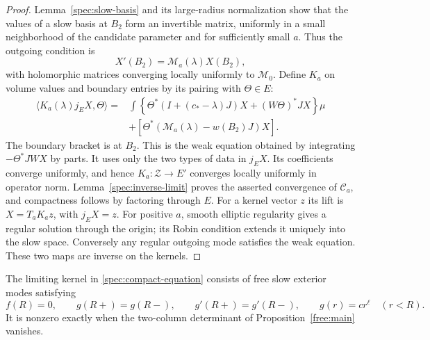 \begin{proof}
Lemma~\ref{spec:slow-basis} and its large-radius normalization show
that the values of a slow basis at $B_2$ form an invertible matrix,
uniformly in a small neighborhood of the candidate parameter and
for sufficiently small $a$. Thus the outgoing condition is
\[
 X'(B_2)=\mathcal M_a(\lambda)X(B_2),
\]
with holomorphic matrices converging locally uniformly to
$\mathcal M_0$. Define $K_a$ on volume values and boundary entries
by its pairing with $\Theta\in E$:
\begin{equation}\label{spec:K-form}
 \begin{split}
 \langle K_a(\lambda)j_EX,\Theta\rangle
 ={}&\int\left\{\Theta^*(I+(c_*-\lambda)J)X
                         +(W\Theta)^*JX\right\}\mu\\
 &+[\Theta^*(\mathcal M_a(\lambda)-w(B_2)J)X].
 \end{split}
\end{equation}
The boundary bracket is at $B_2$. This is the weak equation obtained
by integrating $-\Theta^*JW X$ by parts. It uses only the two types
of data in $j_EX$. Its coefficients converge uniformly, and hence
$K_a:\mathscr Z\to E'$ converges locally uniformly in operator norm.
Lemma~\ref{spec:inverse-limit} proves the asserted convergence of
$\mathcal C_a$, and compactness follows by factoring through $E$.
For a kernel vector $z$ its lift is $X=T_aK_a z$, with $j_EX=z$.
For positive $a$, smooth elliptic regularity gives a regular solution
through the origin; its Robin condition extends it uniquely into the
slow space. Conversely any regular outgoing mode satisfies the weak
equation. These two maps are inverse on the kernels.
\end{proof}

\begin{lemma}
\label{spec:interface}
The limiting kernel in \eqref{spec:compact-equation} consists of free
slow exterior modes satisfying
\begin{equation}\label{spec:matching}
 f(R)=0,\qquad g(R+)=g(R-),\qquad g'(R+)=g'(R-),\qquad
 g(r)=c r^\ell\quad(r<R).
\end{equation}
It is nonzero exactly when the two-column determinant of
Proposition~\ref{free:main} vanishes.
\end{lemma}

